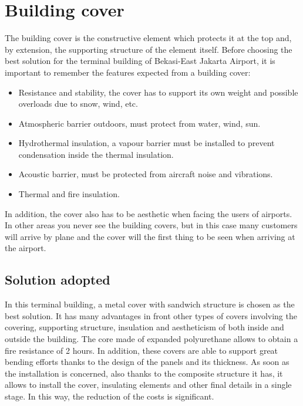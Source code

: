 \chapter{Building cover}

The building cover is the constructive element which protects it at the top and, by extension, the supporting structure of the element itself. Before choosing the best solution for the terminal building of Bekasi-East Jakarta Airport, it is important to remember the features expected from a building cover:

\begin{itemize}
	\item Resistance and stability, the cover has to support its own weight and possible overloads due to snow, wind, etc.
	\item Atmospheric barrier outdoors, must protect from water, wind, sun.
	\item Hydrothermal insulation, a vapour barrier must be installed to prevent condensation inside the thermal insulation.
	\item Acoustic barrier, must be protected from aircraft noise and vibrations.
	\item Thermal and fire insulation.
\end{itemize}

In addition, the cover also has to be aesthetic when facing the users of airports. In other areas you never see the building covers, but in this case many customers will arrive by plane and the cover will the first thing to be seen when arriving at the airport.

	\section{Solution adopted}
In this terminal building, a metal cover with sandwich structure is chosen as the best solution. It has many advantages in front other types of covers involving the covering, supporting structure, insulation and aestheticism of both inside and outside the building. The core made of expanded polyurethane allows to obtain a fire resistance of 2 hours. In addition, these covers are able to support great bending efforts thanks to the design of the panels and its thickness. As soon as the installation is concerned, also thanks to the composite structure it has, it allows to install the cover, insulating elements and other final details in a single stage. In this way, the reduction of the costs is significant.

